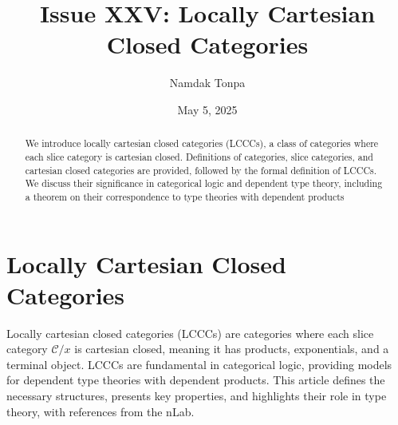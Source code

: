 \documentclass{article}
\theoremstyle{plain}
\theoremstyle{remark}
\begin{document}
\title{Issue XXV: Locally Cartesian Closed Categories}
\author{Namdak Tonpa}
\date{May 5, 2025}

\maketitle

\begin{abstract}
We introduce locally cartesian closed categories (LCCCs), a class of categories where each slice category is cartesian closed. Definitions of categories, slice categories, and cartesian closed categories are provided, followed by the formal definition of LCCCs. We discuss their significance in categorical logic and dependent type theory, including a theorem on their correspondence to type theories with dependent products
\end{abstract}

\ifincludeTOC
  \tableofcontents
\fi

\section{Locally Cartesian Closed Categories}

Locally cartesian closed categories (LCCCs) are categories where each slice category $\mathcal{C}/x$ is cartesian closed, meaning it has products, exponentials, and a terminal object. LCCCs are fundamental in categorical logic, providing models for dependent type theories with dependent products. This article defines the necessary structures, presents key properties, and highlights their role in type theory, with references from the nLab.
\end{document}
